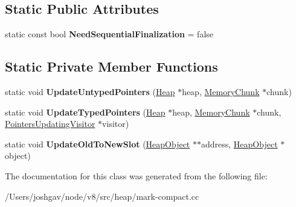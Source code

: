 \subsection*{Static Public Attributes}
\begin{DoxyCompactItemize}
\item 
static const bool {\bfseries Need\+Sequential\+Finalization} = false\hypertarget{classv8_1_1internal_1_1_pointer_update_job_traits_a592286001c6dc1302a775cd9119973ed}{}\label{classv8_1_1internal_1_1_pointer_update_job_traits_a592286001c6dc1302a775cd9119973ed}

\end{DoxyCompactItemize}
\subsection*{Static Private Member Functions}
\begin{DoxyCompactItemize}
\item 
static void {\bfseries Update\+Untyped\+Pointers} (\hyperlink{classv8_1_1internal_1_1_heap}{Heap} $\ast$heap, \hyperlink{classv8_1_1internal_1_1_memory_chunk}{Memory\+Chunk} $\ast$chunk)\hypertarget{classv8_1_1internal_1_1_pointer_update_job_traits_a0cd66680fbcb938899f9447f7a82bc6e}{}\label{classv8_1_1internal_1_1_pointer_update_job_traits_a0cd66680fbcb938899f9447f7a82bc6e}

\item 
static void {\bfseries Update\+Typed\+Pointers} (\hyperlink{classv8_1_1internal_1_1_heap}{Heap} $\ast$heap, \hyperlink{classv8_1_1internal_1_1_memory_chunk}{Memory\+Chunk} $\ast$chunk, \hyperlink{classv8_1_1internal_1_1_pointers_updating_visitor}{Pointers\+Updating\+Visitor} $\ast$visitor)\hypertarget{classv8_1_1internal_1_1_pointer_update_job_traits_ac3d9ab1f3c0ae2c5f08bb0fe0ce4f792}{}\label{classv8_1_1internal_1_1_pointer_update_job_traits_ac3d9ab1f3c0ae2c5f08bb0fe0ce4f792}

\item 
static void {\bfseries Update\+Old\+To\+New\+Slot} (\hyperlink{classv8_1_1internal_1_1_heap_object}{Heap\+Object} $\ast$$\ast$address, \hyperlink{classv8_1_1internal_1_1_heap_object}{Heap\+Object} $\ast$object)\hypertarget{classv8_1_1internal_1_1_pointer_update_job_traits_a81fc1f068c78c337bd7b562dd70ec385}{}\label{classv8_1_1internal_1_1_pointer_update_job_traits_a81fc1f068c78c337bd7b562dd70ec385}

\end{DoxyCompactItemize}


The documentation for this class was generated from the following file\+:\begin{DoxyCompactItemize}
\item 
/\+Users/joshgav/node/v8/src/heap/mark-\/compact.\+cc\end{DoxyCompactItemize}
